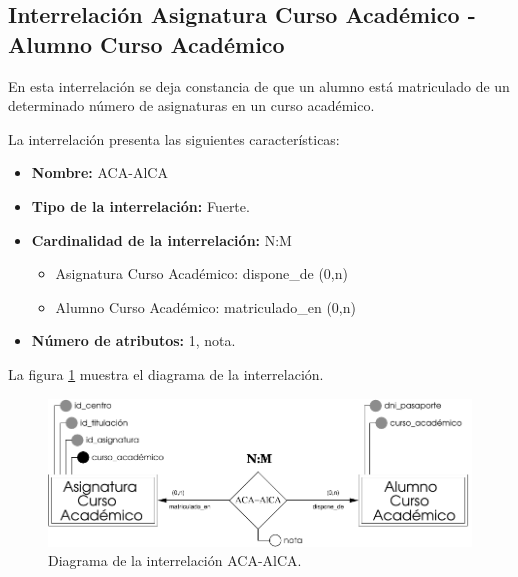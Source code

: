 \subsection{Interrelación Asignatura Curso Académico - Alumno Curso Académico}

   \begin{description}
      \item[Definición] En esta interrelación se deja constancia de que un
      alumno está matriculado de un determinado número de asignaturas en un
      curso académico.

      \item[Características] La interrelación presenta las siguientes
                             características:

         \begin{itemize}
            \item \textbf{Nombre:} ACA-AlCA
            \item \textbf{Tipo de la interrelación:} Fuerte.
            \item \textbf{Cardinalidad de la interrelación:} N:M
                  \begin{itemize}
                     \item Asignatura Curso Académico: dispone\_de (0,n)
                     \item Alumno Curso Académico: matriculado\_en (0,n)
                  \end{itemize}
            \item \textbf{Número de atributos:} 1, nota.
         \end{itemize}

      \item[Diagrama] La figura \ref{diagramaACA-AlCA} muestra el diagrama de la
                      interrelación.

       \item \begin{figure}[!ht]
            \begin{center}
            \includegraphics[]{07.Modelo_Entidad-Interrelacion/7.3.Analisis_Interrelaciones/diagramas/ACA-AlCA.pdf}
            \caption{Diagrama de la interrelación ACA-AlCA.}
            \label{diagramaACA-AlCA}
            \end{center}
         \end{figure}


\end{description}
